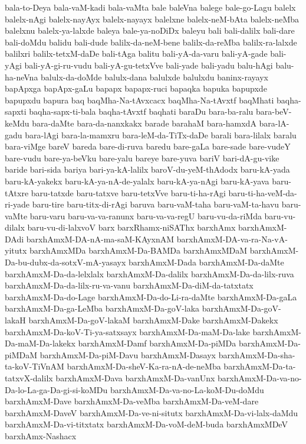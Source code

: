 {bala-to-Deya
bala-vaM-kadi
bala-vaMta
bale
baleVna
balege
bale-go-Lagu
balelx
balelx-nAgi
balelx-nayAyx
balelx-nayayx
balelxne
balelx-neM-bAta
balelx-neMba
balelxnu
balelx-ya-lalxde
baleya
bale-ya-noDiDx
baleyu
bali
bali-dalilx
bali-dare
bali-doMdu
balidu
bali-dude
balilx-da-neM-bene
balilx-da-reMba
balilx-ra-lalxde
balilxri
balilx-tetxM-daDe
bali-tAga
balitu
bali-yA-da-varu
bali-yA-gade
bali-yAgi
bali-yA-gi-ru-vudu
bali-yA-gu-tetxVve
bali-yade
bali-yadu
balu-hAgi
balu-ha-neVna
balulx-da-doMde
balulx-dana
balulxde
balulxdu
baninx-rayayx
bapApxga
bapApx-gaLu
bapapx
bapapx-ruci
bapaqka
bapuka
bapupxde
bapupxdu
bapura
baq
baqMha-Na-tAvxcacx
baqMha-Na-tAvxtf
baqMhati
baqha-sapxti
baqha-sapx-ti-bala
baqha-tAvxtf
baqhati
baraDu
bara-ba-ralu
bara-beV-keMdu
bara-daMte
bara-da-nanxkakx
barade
barahaM
bara-hamxdA
bara-lA-gadu
bara-lAgi
bara-la-mamxru
bara-leM-da-TiTx-daDe
barali
bara-lilalx
baralu
bara-viMge
bareV
bareda
bare-di-ruva
baredu
bare-gaLa
bare-sade
bare-vudeY
bare-vudu
bare-ya-beVku
bare-yalu
bareye
bare-yuva
bariV
bari-dA-gu-vike
baride
bari-sida
bariya
bari-ya-kA-lalilx
baroV-du-yeM-thAdodx
baru-kA-yada
baru-kA-yakekx
baru-kA-ya-nA-de-yalalx
baru-kA-ya-nAgi
baru-kA-yava
baru-tAtxre
baru-tatxde
baru-tatxve
baru-tetxVve
baru-ti-ha-rAgi
baru-ti-ha-veM-da-ri-yade
baru-tire
baru-titx-di-rAgi
baruva
baru-vaM-taha
baru-vaM-ta-havu
baru-vaMte
baru-varu
baru-va-va-ranunx
baru-va-va-regU
baru-vu-da-riMda
baru-vu-dilalx
baru-vu-di-lalxvoV
barx
barxRhamx-niSAThx
barxhAmx
barxhAmxM-DAdi
barxhAmxM-DA-nA-ma-saM-KAyxnAM
barxhAmxM-DA-va-ra-Na-vA-yitutx
barxhAmxMDa
barxhAmxM-Da-BAMDa
barxhAmxMDaM
barxhAmxM-Da-bu-dubx-da-sotxV-mA-yasayx
barxhAmxM-Dada
barxhAmxM-Da-daMte
barxhAmxM-Da-da-lelxlalx
barxhAmxM-Da-dalilx
barxhAmxM-Da-da-lilx-ruva
barxhAmxM-Da-da-lilx-ru-va-vanu
barxhAmxM-Da-diM-da-tatxtatx
barxhAmxM-Da-do-Lage
barxhAmxM-Da-do-Li-ra-daMte
barxhAmxM-Da-gaLa
barxhAmxM-Da-ga-LeMba
barxhAmxM-Da-goV-laka
barxhAmxM-Da-goV-lakaH
barxhAmxM-Da-goV-lakaM
barxhAmxM-Dake
barxhAmxM-Dakekx
barxhAmxM-Da-koV-Ti-ya-satxsayx
barxhAmxM-Da-maM-Da-lake
barxhAmxM-Da-maM-Da-lakekx
barxhAmxM-Damf
barxhAmxM-Da-piMDa
barxhAmxM-Da-piMDaM
barxhAmxM-Da-piM-Davu
barxhAmxM-Dasayx
barxhAmxM-Da-sha-ta-koV-TiVnAM
barxhAmxM-Da-sheV-Ka-ra-nA-de-neMba
barxhAmxM-Da-ta-tatxvX-dalilx
barxhAmxM-Dava
barxhAmxM-Da-vanUnx
barxhAmxM-Da-va-no-Da-lo-La-ga-Da-gi-si-koMDu
barxhAmxM-Da-va-no-La-koM-Du-doMdu
barxhAmxM-Dave
barxhAmxM-Da-veMba
barxhAmxM-Da-veM-dare
barxhAmxM-DaveV
barxhAmxM-Da-ve-ni-situtx
barxhAmxM-Da-vi-lalx-daMdu
barxhAmxM-Da-vi-titxtatx
barxhAmxM-Da-voM-deM-buda
barxhAmxMDeV
barxhAmx-Nashacx
}
